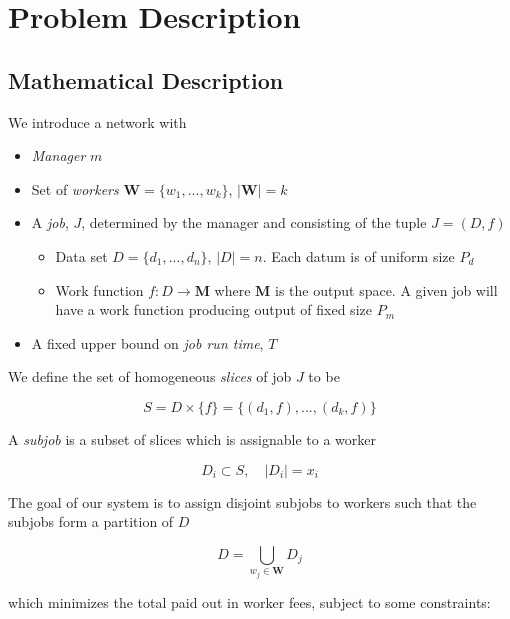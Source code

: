 \documentclass[../mthe-493-final-project.tex]{subfiles}
\begin{document}
    \chapter{Problem Description}
    \label{ch:problem-description}

    \section{Mathematical Description}

    We introduce a network with

    \begin{itemize}
        \item \textit{Manager} $m$
        \item Set of \textit{workers} $\mathbf{W} = \{w_1, ..., w_k\}$, $\vert\mathbf{W}\vert = k$
        \item A \textit{job}, $J$, determined by the manager and consisting of the tuple $J = (D, f)$
              \begin{itemize}
                  \item Data set $D = \{d_1, ..., d_n\}$, $\vert D\vert = n$. Each datum is of uniform size $P_d$
                  \item Work function $f: D \rightarrow \mathbf{M}$ where $\mathbf{M}$ is the output space. A given job will have a work function producing output of fixed size $P_m$
              \end{itemize}
        \item A fixed upper bound on \textit{job run time}, $T$
    \end{itemize}

    We define the set of homogeneous \textit{slices} of job $J$ to be

    \[S = D \times \{f\} = \{(d_1, f), ..., (d_k, f)\}\]

    A \textit{subjob} is a subset of slices which is assignable to a worker

    \[D_i \subset S, \quad \vert D_i \vert = x_i\]

    The goal of our system is to assign disjoint subjobs to workers such that the subjobs form a partition of $D$

    \[D = \bigcup\limits_{w_j \in \mathbf{W}} D_j\]

    which minimizes the total paid out in worker fees, subject to some constraints:
\end{document}
